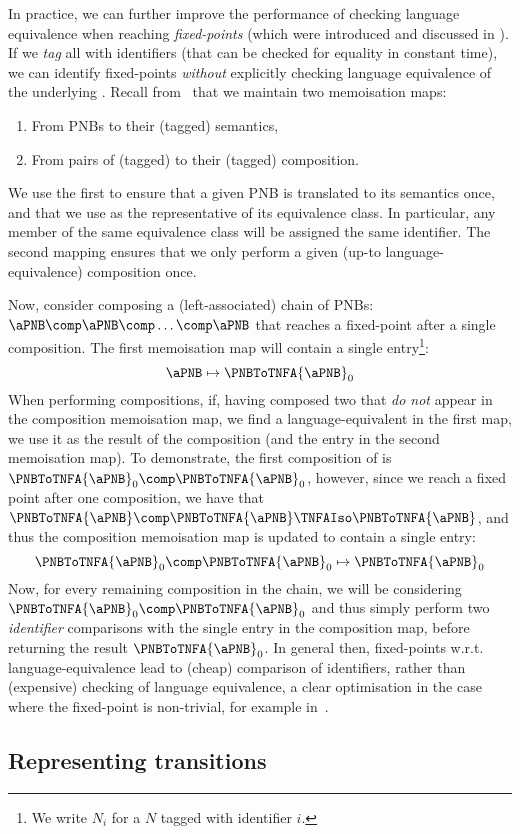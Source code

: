 In practice, we can further improve the performance of checking language
equivalence when reaching \emph{fixed-points} (which were introduced and
discussed in ). If we \emph{tag} all \TNFA{} with
identifiers (that can be checked for equality in constant time), we can
identify fixed-points \emph{without} explicitly checking language equivalence
of the underlying \TNFA{}. Recall from~ that we
maintain two memoisation maps:
\begin{enumerate}
    \item From PNBs to their (tagged) \TNFA{} semantics,
    \item From pairs of (tagged) \TNFA{} to their (tagged) \TNFA{} composition.
\end{enumerate}
We use the first to ensure that a given PNB is translated to its \TNFA{}
semantics once, and that we use \TNFA{} as the representative of its
equivalence class. In particular, any member of the same equivalence class will
be assigned the same identifier. The second mapping ensures that we only
perform a given (up-to language-equivalence) composition once.

Now, consider composing a (left-associated) chain of PNBs: $\aPNB \comp \aPNB
\comp \ldots \comp \aPNB$ that reaches a fixed-point after a single
composition. The first memoisation map will contain a single entry\footnote{We
write $N_i$ for a \TNFA{} $N$ tagged with identifier $i$.}:
\[
    \aPNB \mapsto \PNBToTNFA{\aPNB}_0
\]
When performing \TNFA{} compositions, if, having composed two \TNFA{} that
\emph{do not} appear in the composition memoisation map, we find a
language-equivalent \TNFA{} in the first map, we use it as the result of the
composition (and the entry in the second memoisation map). To demonstrate, the
first composition of \TNFA{} is $\PNBToTNFA{\aPNB}_0 \comp
\PNBToTNFA{\aPNB}_0$, however, since we reach a fixed point after one
composition, we have that $\PNBToTNFA{\aPNB} \comp \PNBToTNFA{\aPNB} \TNFAIso
\PNBToTNFA{\aPNB}$, and thus the composition memoisation map is updated to
contain a single entry:
\[
    \PNBToTNFA{\aPNB}_0 \comp \PNBToTNFA{\aPNB}_0 \mapsto \PNBToTNFA{\aPNB}_0
\]
Now, for every remaining composition in the chain, we will be considering
$\PNBToTNFA{\aPNB}_0 \comp \PNBToTNFA{\aPNB}_0$ and thus simply perform two
\emph{identifier} comparisons with the single entry in the composition map,
before returning the result $\PNBToTNFA{\aPNB}_0$. In general then,
fixed-points w.r.t. language-equivalence lead to (cheap) comparison of
identifiers, rather than (expensive) checking of language equivalence, a clear
optimisation in the case where the fixed-point is non-trivial, for example
in~.

\subsection{Representing \TNFA{} transitions}\label{sec:mtbdds}
{}
